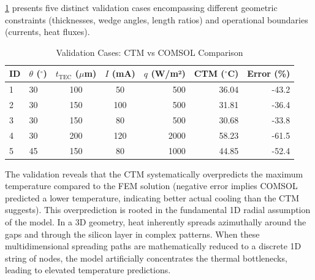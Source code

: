 \documentclass[conference,a4paper]{IEEEtran}
\begin{document}
\cref{tab:validation_cases} presents five distinct validation cases encompassing different geometric constraints (thicknesses, wedge angles, length ratios) and operational boundaries (currents, heat fluxes).

\begin{table}[H]
	\centering
	\caption{Validation Cases: CTM vs COMSOL Comparison}
	\label{tab:validation_cases}
	\begin{tabular}{@{}llccrrr@{}}
		\toprule
		\textbf{ID} & \textbf{$\theta$ ($^\circ$)} & \textbf{$t_{\text{TEC}}$ ($\mu$m)} & \textbf{$I$ (mA)} & \textbf{$q$ (W/m²)} & \textbf{CTM ($^\circ$C)} & \textbf{Error (\%)} \\
		\midrule
		1           & 30                           & 100                                & 50                & 500                 & 36.04                    & -43.2               \\
		2           & 30                           & 150                                & 100               & 500                 & 31.81                    & -36.4               \\
		3           & 30                           & 150                                & 80                & 500                 & 30.68                    & -33.8               \\
		4           & 30                           & 200                                & 120               & 2000                & 58.23                    & -61.5               \\
		5           & 45                           & 150                                & 80                & 1000                & 44.85                    & -52.4               \\
		\bottomrule
	\end{tabular}
\end{table}

The validation reveals that the CTM systematically overpredicts the maximum temperature compared to the FEM solution (negative error implies COMSOL predicted a lower temperature, indicating better actual cooling than the CTM suggests). This overprediction is rooted in the fundamental 1D radial assumption of the model. In a 3D geometry, heat inherently spreads azimuthally around the gaps and through the silicon layer in complex patterns. When these multidimensional spreading paths are mathematically reduced to a discrete 1D string of nodes, the model artificially concentrates the thermal bottlenecks, leading to elevated temperature predictions.
\end{document}
